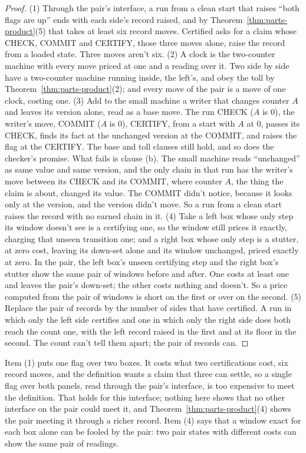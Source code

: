 \documentclass[11pt,twoside]{article}
\theoremstyle{thielethm}
\theoremstyle{thieledef}
\theoremstyle{thieledef}
\theoremstyle{thieledef}
\theoremstyle{thielethm}
\theoremstyle{thieleobs}
\theoremstyle{thielethm}
\begin{document}
\begin{proof}
(1) Through the pair's interface, a run from a clean start that raises ``both flags are up'' ends
with each side's record raised, and by Theorem~\ref{thm:parts-product}(5) that takes at least six
record moves. Certified asks for a claim whose CHECK, COMMIT and CERTIFY, those three moves alone,
raise the record from a loaded state. Three moves aren't six. (2) A
clock is the two-counter machine with every move priced at one and a reading over it. Two side by side have a two-counter machine running inside, the left's, and obey the
toll by Theorem~\ref{thm:parts-product}(2); and every move
of the pair is a move of one clock, costing one. (3) Add to the small machine a writer
that changes counter $A$ and leaves its version alone, read as a base move. The run CHECK ($A$ is
0), the writer's move, COMMIT ($A$ is 0), CERTIFY, from a start with $A$ at 0, passes its CHECK,
finds its fact at the unchanged version at the COMMIT, and raises the flag at the CERTIFY. The base
and toll clauses still hold, and so does the checker's promise. What fails is clause (b). The small machine reads
``unchanged'' as same value and same version, and the only chain in that run has the writer's move
between its CHECK and its COMMIT, where counter $A$, the thing the claim is about, changed its
value. The COMMIT didn't notice, because it looks only at the version, and the version didn't
move. So a run from a clean start raises the record with no earned chain in it. (4) Take a left box whose only step its window doesn't see is a certifying one, so the
window still prices it exactly, charging that unseen transition one; and a right box whose only
step is a stutter, at zero cost, leaving its down-set alone and its window unchanged, priced exactly at
zero. In the pair, the left box's unseen certifying step and the right box's stutter show the same
pair of windows before and after. One costs at least one and leaves the pair's down-set; the other
costs nothing and doesn't. So a price computed from the pair of windows is short on the first or
over on the second. (5) Replace the pair of records by the number of sides that have certified. A
run in which only the left side certifies and one in which only the right side does both reach the
count one, with the left record raised in the first and at its floor in the second. The count can't
tell them apart; the pair of records can.
\end{proof}

Item (1) puts one flag over two boxes. It costs what two certifications cost, six record moves, and the
definition wants a claim that three can settle, so a single flag over both panels, read through
the pair's interface, is too expensive
to meet the definition. That holds for this interface; nothing here shows that no other interface on the
pair could meet it, and Theorem~\ref{thm:parts-product}(4) shows the pair meeting it through a richer record. Item (4) says that a window exact for each box alone can be fooled by the pair: two pair states with different costs can show the same pair of readings.
\end{document}
